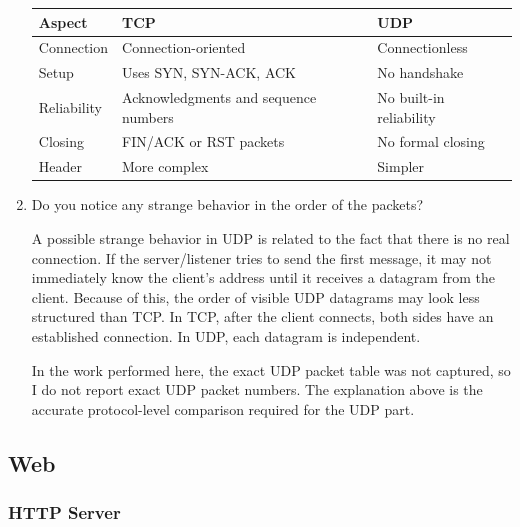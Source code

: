 \documentclass{article}
\begin{document}
\begin{enumerate}
    \begin{center}
    \begin{tabular}{|l|l|l|}
    \hline
    \textbf{Aspect} & \textbf{TCP} & \textbf{UDP} \\
    \hline
    Connection & Connection-oriented & Connectionless \\
    \hline
    Setup & Uses SYN, SYN-ACK, ACK & No handshake \\
    \hline
    Reliability & Acknowledgments and sequence numbers & No built-in reliability \\
    \hline
    Closing & FIN/ACK or RST packets & No formal closing \\
    \hline
    Header & More complex & Simpler \\
    \hline
    \end{tabular}
    \end{center}

    \item Do you notice any strange behavior in the order of the packets?

    A possible strange behavior in UDP is related to the fact that there is no real connection. If the server/listener tries to send the first message, it may not immediately know the client's address until it receives a datagram from the client. Because of this, the order of visible UDP datagrams may look less structured than TCP. In TCP, after the client connects, both sides have an established connection. In UDP, each datagram is independent.

    In the work performed here, the exact UDP packet table was not captured, so I do not report exact UDP packet numbers. The explanation above is the accurate protocol-level comparison required for the UDP part.
\end{enumerate}

\subsection{Web}

\subsubsection{HTTP Server}
\end{document}
